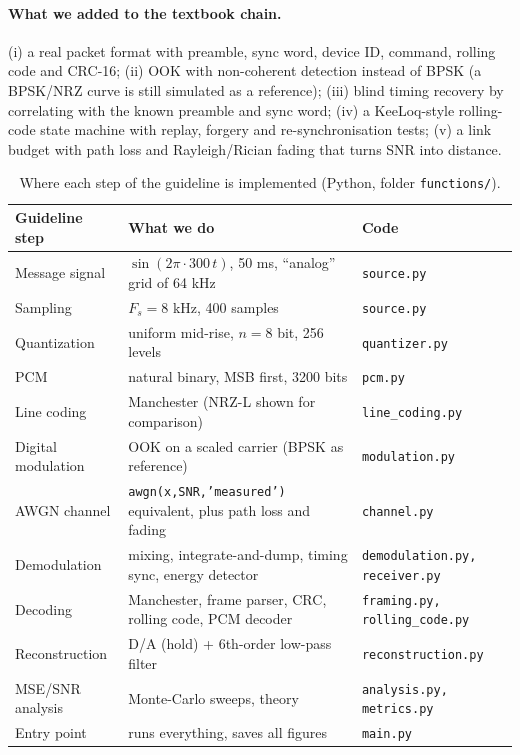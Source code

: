 \documentclass[11pt,a4paper]{article}
\begin{document}
\paragraph{What we added to the textbook chain.}
(i) a real packet format with preamble, sync word, device ID, command, rolling code and CRC-16; (ii) OOK with non-coherent detection instead of BPSK
(a BPSK/NRZ curve is still simulated as a reference); (iii) blind timing recovery by correlating with the known preamble and sync word;
(iv) a KeeLoq-style rolling-code state machine with replay, forgery and re-synchronisation tests; (v) a link budget with path loss and Rayleigh/Rician fading
that turns SNR into distance.

\begin{table}[H]\centering\small
\caption{Where each step of the guideline is implemented (Python, folder \texttt{functions/}).}
\begin{tabular}{@{}p{3.6cm}p{6.6cm}p{4.5cm}@{}}\toprule
Guideline step & What we do & Code\\\midrule
Message signal & $\sin(2\pi\cdot300\,t)$, 50 ms, ``analog'' grid of 64 kHz & \texttt{source.py}\\
Sampling & $F_s=8$ kHz, 400 samples & \texttt{source.py}\\
Quantization & uniform mid-rise, $n=8$ bit, 256 levels & \texttt{quantizer.py}\\
PCM & natural binary, MSB first, 3200 bits & \texttt{pcm.py}\\
Line coding & Manchester (NRZ-L shown for comparison) & \texttt{line\_coding.py}\\
Digital modulation & OOK on a scaled carrier (BPSK as reference) & \texttt{modulation.py}\\
AWGN channel & \texttt{awgn(x,SNR,'measured')} equivalent, plus path loss and fading & \texttt{channel.py}\\
Demodulation & mixing, integrate-and-dump, timing sync, energy detector & \texttt{demodulation.py, receiver.py}\\
Decoding & Manchester, frame parser, CRC, rolling code, PCM decoder & \texttt{framing.py, rolling\_code.py}\\
Reconstruction & D/A (hold) + 6th-order low-pass filter & \texttt{reconstruction.py}\\
MSE/SNR analysis & Monte-Carlo sweeps, theory & \texttt{analysis.py, metrics.py}\\
Entry point & runs everything, saves all figures & \texttt{main.py}\\\bottomrule
\end{tabular}
\end{table}
\end{document}
